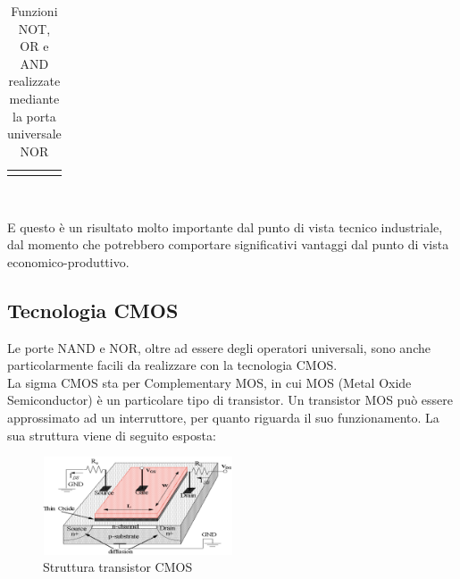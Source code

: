 \documentclass[a4paper]{extarticle}
\begin{document}
\begin{itemize}
\begin{table}[H]
\begin{tabularx}{\textwidth}{PPP}
{
              }
         \end{tabularx}\\
         \caption{Funzioni NOT, OR e AND realizzate mediante la porta universale NOR}
         \label{tab:NOT_OR_AND_tramite_NOR}
     \end{table}
\end{itemize}
E questo è un risultato molto importante dal punto di vista tecnico industriale, dal momento che potrebbero comportare significativi vantaggi dal punto di vista economico-produttivo.

\vspace{1em}
\noindent
\subsection{Tecnologia CMOS}
Le porte NAND e NOR, oltre ad essere degli operatori universali, sono anche particolarmente facili da realizzare con la tecnologia CMOS.\\
La sigma CMOS sta per Complementary MOS, in cui MOS (Metal Oxide Semiconductor) è un particolare tipo di transistor. Un transistor MOS può essere approssimato ad un interruttore, per quanto riguarda il suo funzionamento. La sua struttura viene di seguito esposta:

\begin{figure}[H]
    \centering
    \includegraphics[width=0.5\textwidth]{transistor-cmos-struttura.png}
    \caption{Struttura transistor CMOS}
    \label{fig:transistor_cmos_strut}
\end{figure}
\end{document}
